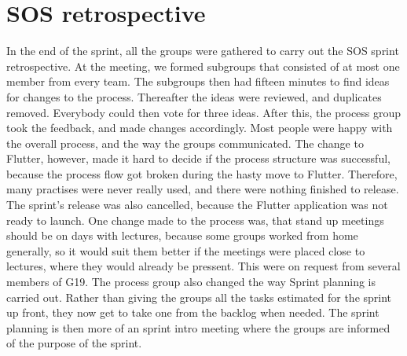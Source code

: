 \section{SOS retrospective}
In the end of the sprint, all the groups were gathered to carry out the SOS sprint retrospective. 
At the meeting, we formed subgroups that consisted of at most one member from every team. 
The subgroups then had fifteen minutes to find ideas for changes to the process. 
Thereafter the ideas were reviewed, and duplicates removed. Everybody could then vote for three ideas. 
After this, the process group took the feedback, and made changes accordingly. 
Most people were happy with the overall process, and the way the groups communicated. 
The change to Flutter, however, made it hard to decide if the process structure was successful, because the process flow got broken during the hasty move to Flutter. Therefore, many practises were never really used, and there were nothing finished to release.
The sprint's release was also cancelled, because the Flutter application was not ready to launch. 
One change made to the process was, that stand up meetings should be on days with lectures, because some groups worked from home generally, so it would suit them better if the meetings were placed close to lectures, where they would already be pressent.
This were on request from several members of G19. 
The process group also changed the way Sprint planning is carried out.
Rather than giving the groups all the tasks estimated for the sprint up front, they now get to take one from the backlog when needed. 
The sprint planning is then more of an sprint intro meeting where the groups are informed of the purpose of the sprint. 
